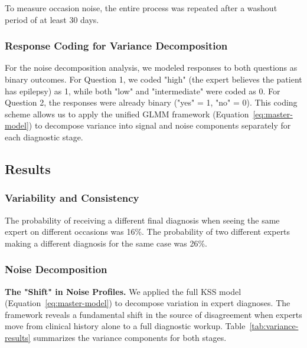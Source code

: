 \documentclass[num-refs]{wiley-article}
\begin{document}
To measure occasion noise, the entire process was repeated after a washout period of at least 30 days.

\subsubsection*{Response Coding for Variance Decomposition}

For the noise decomposition analysis, we modeled responses to both questions as binary outcomes. For Question 1, we coded "high" (the expert believes the patient has epilepsy) as 1, while both "low" and "intermediate" were coded as 0. For Question 2, the responses were already binary ("yes" = 1, "no" = 0). This coding scheme allows us to apply the unified GLMM framework (Equation~\ref{eq:master-model}) to decompose variance into signal and noise components separately for each diagnostic stage.

\subsection*{Results}

\subsubsection*{Variability and Consistency}

The probability of receiving a different final diagnosis when seeing the same expert on different occasions was 16\%. The probability of two different experts making a different diagnosis for the same case was 26\%.

\subsubsection*{Noise Decomposition}

\textbf{The "Shift" in Noise Profiles.} We applied the full KSS model (Equation~\ref{eq:master-model}) to decompose variation in expert diagnoses. The framework reveals a fundamental shift in the source of disagreement when experts move from clinical history alone to a full diagnostic workup. Table~\ref{tab:variance-results} summarizes the variance components for both stages.
\end{document}
